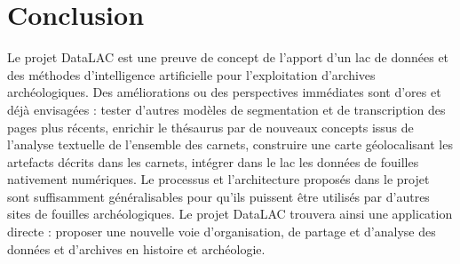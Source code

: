 \documentclass[final, fra]{anthology-ch}     %
\begin{document}
\section{Conclusion}
Le projet DataLAC est une preuve de concept de l’apport d’un lac de données et des méthodes d’intelligence artificielle pour l’exploitation d’archives archéologiques. Des améliorations ou des perspectives immédiates sont d'ores et déjà envisagées : tester d'autres modèles de segmentation et de transcription des pages plus récents, enrichir le thésaurus par de nouveaux concepts issus de l'analyse textuelle de l'ensemble des carnets, construire une carte géolocalisant les artefacts décrits dans les carnets, intégrer dans le lac les données de fouilles nativement numériques. 
Le processus et l'architecture proposés dans le projet sont suffisamment généralisables pour qu'ils puissent être utilisés par d'autres sites de fouilles archéologiques. Le projet DataLAC trouvera ainsi une application directe : proposer une nouvelle voie d'organisation, de partage et d'analyse des données et d'archives en histoire et archéologie.



\printbibliography
%
\end{document}
